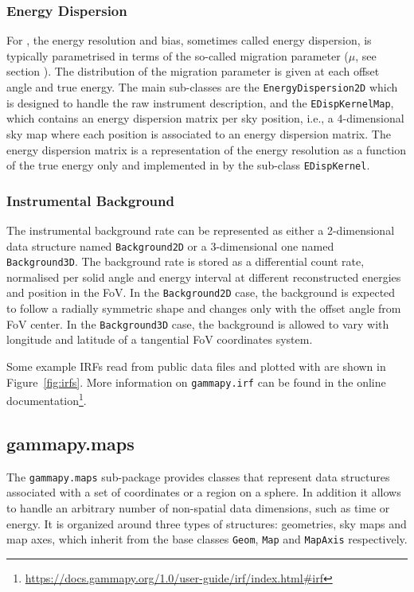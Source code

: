 \documentclass[longauth]{aa}
\newcommand{\code}[1]{\texttt{#1}}
\begin{document}
\subsubsection{Energy Dispersion}
For \iacts, the energy resolution and bias, sometimes called energy dispersion,
is typically parametrised in terms of the so-called
migration parameter ($\mu$, see section \label{sec:gammaray-data-analysis}).
The distribution of the migration parameter is given at each offset angle and
true energy. The main sub-classes are the \code{EnergyDispersion2D} which is
designed to handle the raw instrument description, and the \code{EDispKernelMap},
which contains an energy dispersion matrix per sky position, i.e., a 4-dimensional
sky map where each position is associated to an energy dispersion matrix.
The energy dispersion matrix is a representation of the energy resolution
as a function of the true energy only and implemented in \gammapy
by the sub-class \code{EDispKernel}.

\subsubsection{Instrumental Background}
The instrumental background rate can be represented as either a 2-dimensional
data structure named \code{Background2D} or a 3-dimensional one named \code{Background3D}.
The background rate is stored as a differential count rate, normalised per solid angle
and energy interval at different reconstructed energies and position in the FoV.
In the \code{Background2D} case, the background is expected to follow a radially symmetric shape
and changes only with the offset angle from FoV center.
In the \code{Background3D} case, the background is allowed to vary with 
longitude and latitude of a tangential FoV coordinates system.

Some example IRFs read from public data files and plotted with \gammapy are shown 
in Figure~\ref{fig:irfs}. More information on \code{gammapy.irf} can be found 
in the online documentation\footnote{\url{https://docs.gammapy.org/1.0/user-guide/irf/index.html\#irf}}.

\subsection{gammapy.maps}
\label{ssec:gammapy-maps}
The \code{gammapy.maps} sub-package provides classes that represent data
structures associated with a set of coordinates or a region on a sphere. In
addition it allows to handle an arbitrary number of non-spatial data
dimensions, such as time or energy. It is organized around three types of
structures: geometries, sky maps and map axes, which inherit from the base
classes \code{Geom}, \code{Map} and \code{MapAxis} respectively.
\end{document}
